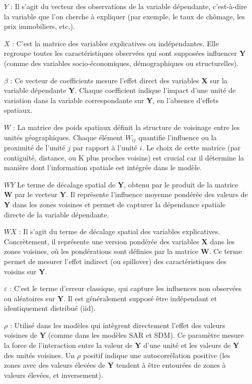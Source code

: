 \documentclass[
]{article}
\begin{document}
\begin{itemize}
\item[\(Y\)] : Il s'agit du vecteur des observations de la variable dépendante, c'est-à-dire la variable que l'on cherche à expliquer (par exemple, le taux de chômage, les prix immobiliers, etc.).
\item[\(X\)] : C'est la matrice des variables explicatives ou indépendantes. Elle regroupe toutes les caractéristiques observées qui sont supposées influencer \textbf{Y} (comme des variables socio-économiques, démographiques ou structurelles).
\item[\(\beta\)] : Ce vecteur de coefficients mesure l'effet direct des variables \textbf{X} sur la variable dépendante \textbf{Y}. Chaque coefficient indique l'impact d'une unité de variation dans la variable correspondante sur \textbf{Y}, en l'absence d'effets spatiaux.
\item[\(W\)] : La matrice des poids spatiaux définit la structure de voisinage entre les unités géographiques. Chaque élément \(W_{ij}\) quantifie l'influence ou la proximité de l'unité \(j\) par rapport à l'unité \(i\). Le choix de cette matrice (par contiguïté, distance, ou K plus proches voisins) est crucial car il détermine la manière dont l'information spatiale est intégrée dans le modèle.
\item[\(WY\)] Le terme de décalage spatial de \textbf{Y}, obtenu par le produit de la matrice \textbf{W} par le vecteur \textbf{Y}. Il représente l'influence moyenne pondérée des valeurs de \textbf{Y} dans les zones voisines et permet de capturer la dépendance spatiale directe de la variable dépendante.
\item[\(WX\)] : Il s'agit du terme de décalage spatial des variables explicatives. Concrètement, il représente une version pondérée des variables \textbf{X} dans les zones voisines, où les pondérations sont définies par la matrice \textbf{W}. Ce terme permet de mesurer l'effet indirect (ou spillover) des caractéristiques des voisins sur \textbf{Y}.
\item[\(\varepsilon\)] : C'est le terme d'erreur classique, qui capture les influences non observées ou aléatoires sur \textbf{Y}. Il est généralement supposé être indépendant et identiquement distribué (iid).
\item[\(\rho\)] : Utilisé dans les modèles qui intègrent directement l'effet des valeurs voisines de \textbf{Y} (comme dans les modèles SAR et SDM). Ce paramètre mesure la force de l'interaction entre la valeur de \textbf{Y} d'une unité et les valeurs de \textbf{Y} des unités voisines. Un \(\rho\) positif indique une autocorrélation positive (les zones avec des valeurs élevées de \textbf{Y} tendent à être entourées de zones à valeurs élevées, et inversement).

\end{itemize}
\end{document}
